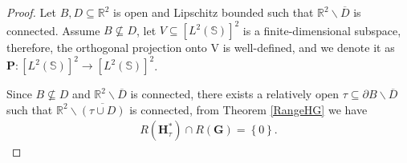 \documentclass[11pt,reqno,twoside]{amsart}
\theoremstyle{definition}
\theoremstyle{remark}
\numberwithin{equation}{section}
\begin{document}
\begin{proof}
Let $B, D  \subseteq \mathbb R^2$ is open and Lipschitz bounded such that $\mathbb R^2 \backslash \overline {D}$ is connected. Assume $B \nsubseteq D$, let $V \subseteq \left[L^{2}\left(\mathbb S\right) \right] ^2 $ is a finite-dimensional subspace, therefore, the orthogonal projection onto V is well-defined, and we denote it as $\mathbf P :\left[L^{2}\left(\mathbb S\right) \right] ^2 \to \left[L^{2}\left(\mathbb S\right) \right] ^2$. 

Since $B \nsubseteq D $ and $\mathbb R^2 \backslash \overline {D}$ is connected, there exists a relatively open $\tau \subseteq \partial B\backslash \overline{D}$ such that $\mathbb R^2 \backslash \overline {\left( \tau \cup D\right) }$ is connected, from Theorem \ref{RangeHG} we have
\begin{align}\label{eq:RangeHtG}
R\left( \mathbf H^*_{\tau} \right) \cap R\left( \mathbf G\right) =\left\lbrace 0\right\rbrace .
\end{align}


\end{proof}
\end{document}
